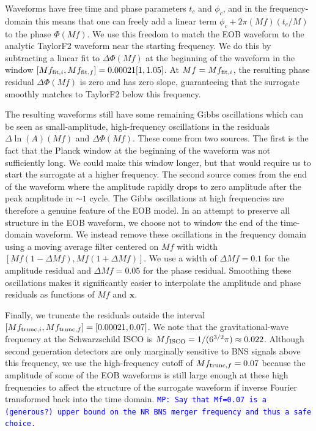 \documentclass[prd,aps,letter,twocolumn,floatfix,notitlepage,nofootinbib]{revtex4-1}
\def\bx{\mathbf{x}}
\newcommand{\MP}[1]{{\textcolor{blue}{\texttt{MP: #1}} }}
\begin{document}
Waveforms have free time and phase parameters $t_c$ and $\phi_c$, and in the frequency-domain this means that one can freely add a linear term $\phi_c + 2\pi (Mf) (t_c/M)$ to the phase $\Phi(Mf)$. We use this freedom to match the EOB waveform to the analytic TaylorF2 waveform near the starting frequency. We do this by subtracting a linear fit to $\Delta\Phi(Mf)$ at the beginning of the waveform in the window $[Mf_{{\rm fit}, i}, Mf_{{\rm fit}, f}] = 0.00021[1, 1.05]$. At $Mf=Mf_{{\rm fit}, i}$, the resulting phase residual $\Delta\Phi(Mf)$ is zero and has zero slope, guaranteeing that the surrogate smoothly matches to TaylorF2 below this frequency.

The resulting waveforms still have some remaining Gibbs oscillations which can be seen as small-amplitude, high-frequency oscillations in the residuals $\Delta\ln(A)(Mf)$ and $\Delta\Phi(Mf)$. These come from two sources. The first is the fact that the Planck window at the beginning of the waveform was not sufficiently long. We could make this window longer, but that would require us to start the surrogate at a higher frequency. The second source comes from the end of the waveform where the amplitude rapidly drops to zero amplitude after the peak amplitude in $\sim 1$ cycle. The Gibbs oscillations at high frequencies are therefore a genuine feature of the EOB model. In an attempt to preserve all structure in the EOB waveform, we choose not to window the end of the time-domain waveform. We instead remove these oscillations in the frequency domain using a moving average filter centered on $Mf$ with width $[Mf(1-\Delta Mf), Mf(1+\Delta Mf)]$. We use a width of $\Delta Mf=0.1$ for the amplitude residual and $\Delta Mf=0.05$ for the phase residual. Smoothing these oscillations makes it significantly easier to interpolate the amplitude and phase residuals as functions of $Mf$ and $\bx$.

Finally, we truncate the residuals outside the interval $[Mf_{{\rm trunc}, i}, Mf_{{\rm trunc}, f}] = [0.00021, 0.07]$. We note that the gravitational-wave frequency at the Schwarzschild ISCO is $Mf_{\rm ISCO} = 1/(6^{3/2}\pi) \approx 0.022$. Although second generation detectors are only marginally sensitive to BNS signals above this frequency, we use the high-frequency cutoff of $Mf_{{\rm trunc}, f}=0.07$ because the amplitude of some of the EOB waveforms is still large enough at these high frequencies to affect the structure of the surrogate waveform if inverse Fourier transformed back into the time domain. \MP{Say that Mf=0.07 is a (generous?) upper bound on the NR BNS merger frequency and thus a safe choice.}
\end{document}
